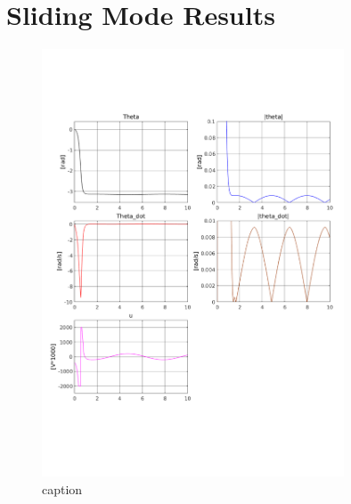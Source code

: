 \chapter{Sliding Mode Results} %
\label{cha:sliding_mode}
\begin{figure}[htbp]
        \centering
        \includegraphics[width=0.8\textwidth,trim=0.5cm 5cm 0.5cm 4cm, clip]{smc.pdf}
        \caption{caption}
        \label{fig:label}
\end{figure}


